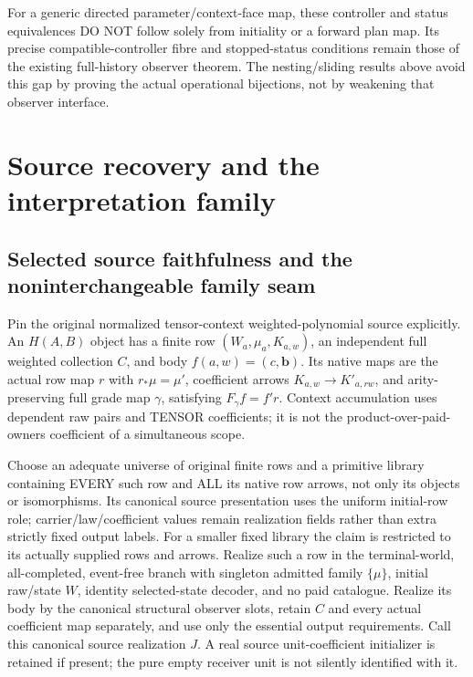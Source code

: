 \documentclass[11pt]{article}
\begin{document}
For a generic directed parameter/context-face map, these controller and status equivalences DO NOT follow solely from initiality or a forward plan map. Its precise compatible-controller fibre and stopped-status conditions remain those of the existing full-history observer theorem. The nesting/sliding results above avoid this gap by proving the actual operational bijections, not by weakening that observer interface.


\section{Source recovery and the interpretation family}
\subsection*{Selected source faithfulness and the noninterchangeable family seam}
Pin the original normalized tensor-context weighted-polynomial source explicitly. An $H(A,B)$ object has a finite row $(W_a,\mu_a,K_{a,w})$, an independent full weighted collection $C$, and body $f(a,w)=(c,\mathbf b)$. Its native maps are the actual row map $r$ with $r_*\mu=\mu'$, coefficient arrows $K_{a,w}\to K'_{a,rw}$, and arity-preserving full grade map $\gamma$, satisfying $F_\gamma f=f'r$. Context accumulation uses dependent raw pairs and TENSOR coefficients; it is not the product-over-paid-owners coefficient of a simultaneous scope.

Choose an adequate universe of original finite rows and a primitive library containing EVERY such row and ALL its native row arrows, not only its objects or isomorphisms. Its canonical source presentation uses the uniform initial-row role; carrier/law/coefficient values remain realization fields rather than extra strictly fixed output labels. For a smaller fixed library the claim is restricted to its actually supplied rows and arrows. Realize such a row in the terminal-world, all-completed, event-free branch with singleton admitted family $\{\mu\}$, initial raw/state $W$, identity selected-state decoder, and no paid catalogue. Realize its body by the canonical structural observer slots, retain $C$ and every actual coefficient map separately, and use only the essential output requirements. Call this canonical source realization $J$. A real source unit-coefficient initializer is retained if present; the pure empty receiver unit is not silently identified with it.
\end{document}
